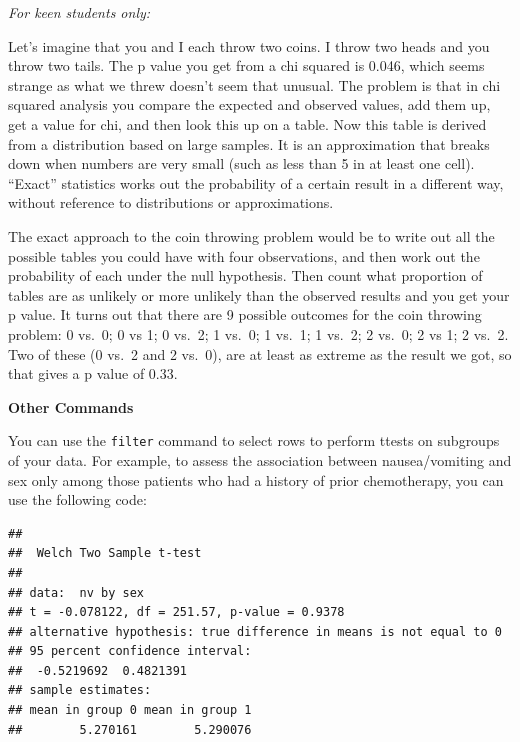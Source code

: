 \documentclass[]{book}
\newenvironment{Shaded}{\begin{snugshade}}{\end{snugshade}}
\newcommand{\DataTypeTok}[1]{\textcolor[rgb]{0.13,0.29,0.53}{#1}}
\newcommand{\DecValTok}[1]{\textcolor[rgb]{0.00,0.00,0.81}{#1}}
\newcommand{\KeywordTok}[1]{\textcolor[rgb]{0.13,0.29,0.53}{\textbf{#1}}}
\newcommand{\NormalTok}[1]{#1}
\newcommand{\OperatorTok}[1]{\textcolor[rgb]{0.81,0.36,0.00}{\textbf{#1}}}
\newcommand{\StringTok}[1]{\textcolor[rgb]{0.31,0.60,0.02}{#1}}
\begin{document}
\emph{For keen students only:}

Let's imagine that you and I each throw two coins. I throw two heads and
you throw two tails. The p value you get from a chi squared is 0.046,
which seems strange as what we threw doesn't seem that unusual. The
problem is that in chi squared analysis you compare the expected and
observed values, add them up, get a value for chi, and then look this up
on a table. Now this table is derived from a distribution based on large
samples. It is an approximation that breaks down when numbers are very
small (such as less than 5 in at least one cell). ``Exact'' statistics
works out the probability of a certain result in a different way,
without reference to distributions or approximations.

The exact approach to the coin throwing problem would be to write out
all the possible tables you could have with four observations, and then
work out the probability of each under the null hypothesis. Then count
what proportion of tables are as unlikely or more unlikely than the
observed results and you get your p value. It turns out that there are 9
possible outcomes for the coin throwing problem: 0 vs.~0; 0 vs 1; 0
vs.~2; 1 vs.~0; 1 vs.~1; 1 vs.~2; 2 vs.~0; 2 vs 1; 2 vs.~2. Two of these
(0 vs.~2 and 2 vs.~0), are at least as extreme as the result we got, so
that gives a p value of 0.33.

\textbf{Other Commands}

You can use the \texttt{filter} command to select rows to perform ttests
on subgroups of your data. For example, to assess the association
between nausea/vomiting and sex only among those patients who had a
history of prior chemotherapy, you can use the following code:

\begin{Shaded}
\end{Shaded}

\begin{verbatim}
## 
##  Welch Two Sample t-test
## 
## data:  nv by sex
## t = -0.078122, df = 251.57, p-value = 0.9378
## alternative hypothesis: true difference in means is not equal to 0
## 95 percent confidence interval:
##  -0.5219692  0.4821391
## sample estimates:
## mean in group 0 mean in group 1 
##        5.270161        5.290076
\end{verbatim}
\end{document}
